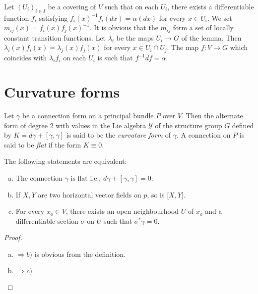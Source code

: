 \begin{proofofthetheorem} 
  Let $(U_i)_{i\in I}$ be a covering of
  $V$ such that on each $U_i$, there exists a differentiable function
  $f_i$ satisfying $f_i(x)^{-1} f_i(dx) = \alpha(dx)$ for every $x \in U_i$. We
  set $m_{ij}(x) = f_i (x) f_j (x)^{-1}$. It is obvious that the
  $m_{ij}$ form a set of locally constant transition functions. Let
  $\lambda_i$ be the maps $U_i \rightarrow G$ of the lemma. Then
  $\lambda_i(x) f_i (x) = \lambda_j(x) f_j(x)$ for every $x \in U_i \cap
  U_j$. The map $f : V \rightarrow G$ which coincides with $\lambda_i
  f_i$ on each $U_i$ is such that $f^{-1}df = \alpha$. 
\end{proofofthetheorem}

\section{Curvature forms}\label{chap3:sec6}%

\begin{defn}\label{chap3:sec6:def2}%
  Let $\gamma$ be a connection form on a principal bundle $P$ over
  $V$. Then the alternate form of degree $2$ with values in the Lie
  algebra $\mathscr{Y}$ of the structure group $G$ defined by $K = d
  \gamma + [\gamma, \gamma]$ is said to be the {\em{curvature form}}
  of $\gamma$. A connection on $P$ is said to be {\em{flat}} if the
  form $K \equiv 0$. 
\end{defn}

\begin{theorem}\label{chap3:sec6:thm5}%
  The following statements are equivalent:
  \begin{enumerate}[a)]
  \item The connection $\gamma$ is flat i.e., $d \gamma + [\gamma,
    \gamma] = 0$. 
  \item If $X,Y$ are two horizontal vector fields on $p$, so is [$X,Y$].
  \item For every $x_o \in V$, there exists an open neighbourhood $U$
    of $x_o$ and a differentiable section $\sigma$ on $U$ such that
    $\sigma^* \gamma = 0$. 
  \end{enumerate}
\end{theorem}

\begin{proof}%
  \begin{enumerate}[a)]
  \item $\Rightarrow b)$ is obvious from the definition.
  \item $\Rightarrow c)$
  \end{enumerate}
\end{proof}

